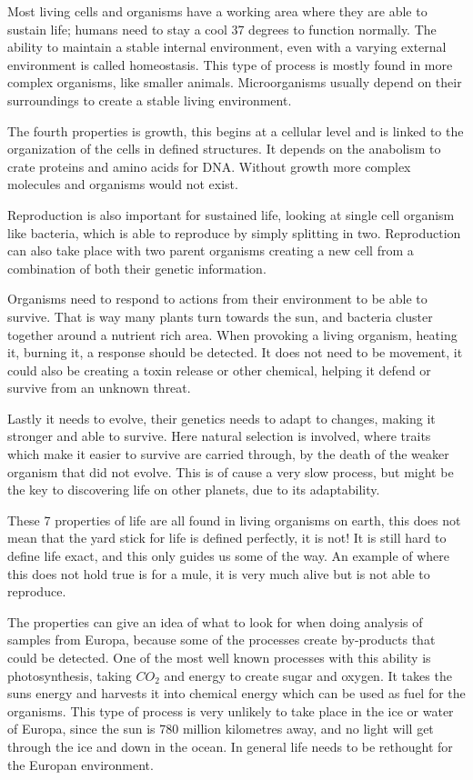 Most living cells and organisms have a working area where they are able to sustain life; humans need to stay a cool 37 degrees to function normally. The ability to maintain a stable internal environment, even with a varying external environment is called homeostasis. This type of process is mostly found in more complex organisms, like smaller animals. Microorganisms usually depend on their surroundings to create a stable living environment.

The fourth properties is growth, this begins at a cellular level and is linked to the organization of the cells in defined structures. It depends on the anabolism to crate proteins and amino acids for DNA. Without growth more complex molecules and organisms would not exist.

Reproduction is also important for sustained life, looking at single cell organism like bacteria, which is able to reproduce by simply splitting in two. Reproduction can also take place with two parent organisms creating a new cell from a combination of both their genetic information.

Organisms need to respond to actions from their environment to be able to survive. That is way many plants turn towards the sun, and bacteria cluster together around a nutrient rich area. When provoking a living organism, heating it, burning it, a response should be detected. It does not need to be movement, it could also be creating a toxin release or other chemical, helping it defend or survive from an unknown threat.

Lastly it needs to evolve, their genetics needs to adapt to changes, making it stronger and able to survive. Here natural selection is involved, where traits which make it easier to survive are carried through, by the death of the weaker organism that did not evolve. This is of cause a very slow process, but might be the key to discovering life on other planets, due to its adaptability.

These 7 properties of life are all found in living organisms on earth, this does not mean that the yard stick for life is defined perfectly, it is not! It is still hard to define life exact, and this only guides us some of the way. An example of where this does not hold true is for a mule, it is very much alive but is not able to reproduce\cite{Mule}.

The properties can give an idea of what to look for when doing analysis of samples from Europa, because some of the processes create by-products that could be detected. One of the most well known processes with this ability is photosynthesis, taking $CO_2$ and energy to create sugar and oxygen. It takes the suns energy and harvests it into chemical energy which can be used as fuel for the organisms. This type of process is very unlikely to take place in the ice or water of Europa, since the sun is 780 million kilometres away, and no light will get through the ice and down in the ocean. In general life needs to be rethought for the Europan environment.

